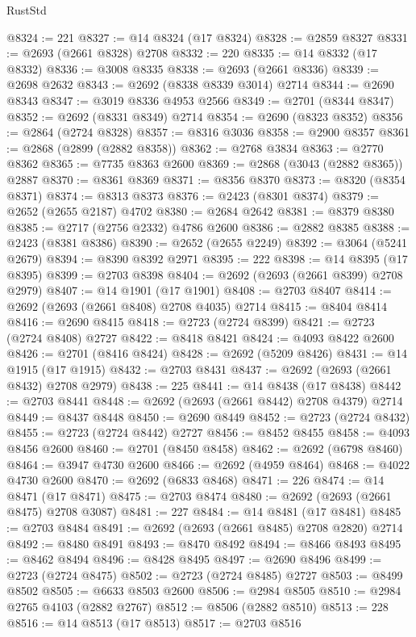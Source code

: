 \begin{lexlean}{RustStd}
\begin{coremodule}
@8324 := 221
@8327 := @14 @8324 (@17 @8324)
@8328 := @2859 @8327
@8331 := @2693 (@2661 @8328) @2708
@8332 := 220
@8335 := @14 @8332 (@17 @8332)
@8336 := @3008 @8335
@8338 := @2693 (@2661 @8336)
@8339 := @2698 @2632
@8343 := @2692 (@8338 @8339 @3014) @2714
@8344 := @2690 @8343
@8347 := @3019 @8336 @4953 @2566
@8349 := @2701 (@8344 @8347)
@8352 := @2692 (@8331 @8349) @2714
@8354 := @2690 (@8323 @8352)
@8356 := @2864 (@2724 @8328)
@8357 := @8316 @3036
@8358 := @2900 @8357
@8361 := @2868 (@2899 (@2882 @8358))
@8362 := @2768 @3834
@8363 := @2770 @8362
@8365 := @7735 @8363 @2600
@8369 := @2868 (@3043 (@2882 @8365)) @2887
@8370 := @8361 @8369
@8371 := @8356 @8370
@8373 := @8320 (@8354 @8371)
@8374 := @8313 @8373
@8376 := @2423 (@8301 @8374)
@8379 := @2652 (@2655 @2187) @4702
@8380 := @2684 @2642
@8381 := @8379 @8380
@8385 := @2717 (@2756 @2332) @4786 @2600
@8386 := @2882 @8385
@8388 := @2423 (@8381 @8386)
@8390 := @2652 (@2655 @2249)
@8392 := @3064 (@5241 @2679)
@8394 := @8390 @8392 @2971
@8395 := 222
@8398 := @14 @8395 (@17 @8395)
@8399 := @2703 @8398
@8404 := @2692 (@2693 (@2661 @8399) @2708 @2979)
@8407 := @14 @1901 (@17 @1901)
@8408 := @2703 @8407
@8414 := @2692 (@2693 (@2661 @8408) @2708 @4035) @2714
@8415 := @8404 @8414
@8416 := @2690 @8415
@8418 := @2723 (@2724 @8399)
@8421 := @2723 (@2724 @8408) @2727
@8422 := @8418 @8421
@8424 := @4093 @8422 @2600
@8426 := @2701 (@8416 @8424)
@8428 := @2692 (@5209 @8426)
@8431 := @14 @1915 (@17 @1915)
@8432 := @2703 @8431
@8437 := @2692 (@2693 (@2661 @8432) @2708 @2979)
@8438 := 225
@8441 := @14 @8438 (@17 @8438)
@8442 := @2703 @8441
@8448 := @2692 (@2693 (@2661 @8442) @2708 @4379) @2714
@8449 := @8437 @8448
@8450 := @2690 @8449
@8452 := @2723 (@2724 @8432)
@8455 := @2723 (@2724 @8442) @2727
@8456 := @8452 @8455
@8458 := @4093 @8456 @2600
@8460 := @2701 (@8450 @8458)
@8462 := @2692 (@6798 @8460)
@8464 := @3947 @4730 @2600
@8466 := @2692 (@4959 @8464)
@8468 := @4022 @4730 @2600
@8470 := @2692 (@6833 @8468)
@8471 := 226
@8474 := @14 @8471 (@17 @8471)
@8475 := @2703 @8474
@8480 := @2692 (@2693 (@2661 @8475) @2708 @3087)
@8481 := 227
@8484 := @14 @8481 (@17 @8481)
@8485 := @2703 @8484
@8491 := @2692 (@2693 (@2661 @8485) @2708 @2820) @2714
@8492 := @8480 @8491
@8493 := @8470 @8492
@8494 := @8466 @8493
@8495 := @8462 @8494
@8496 := @8428 @8495
@8497 := @2690 @8496
@8499 := @2723 (@2724 @8475)
@8502 := @2723 (@2724 @8485) @2727
@8503 := @8499 @8502
@8505 := @6633 @8503 @2600
@8506 := @2984 @8505
@8510 := @2984 @2765 @4103 (@2882 @2767)
@8512 := @8506 (@2882 @8510)
@8513 := 228
@8516 := @14 @8513 (@17 @8513)
@8517 := @2703 @8516

\end{coremodule}
\end{lexlean}
